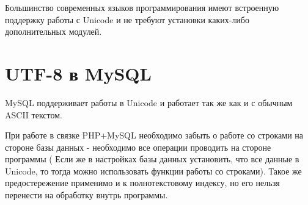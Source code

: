 Большинство современных языков программирования имеют встроенную поддержку работы с Unicode  и не требуют установки каких-либо дополнительных модулей. 


\section{ UTF-8 в MySQL } \label{sect4_12}

MySQL поддерживает работы в Unicode и работает так же как и с обычным ASCII текстом.

При работе в связке PHP+MySQL необходимо забыть о работе со строками на стороне базы данных - необходимо все операции проводить на стороне программы ( Если же в настройках базы данных установить, что все данные в Unicode, то тогда можно использовать функции работы со строками). Такое же предостережение применимо и к полнотекстовому индексу, но его нельзя перенести на обработку внутрь программы.









 
 
 
 
 
 
 
 
 
 
 
 
 
 
 
 
 
 
 
 
 
 
 
 
 
 
 
 
 
 
 
 
 
 
 
 
 
 
 
 
 
 
 
 
 
 \clearpage

 